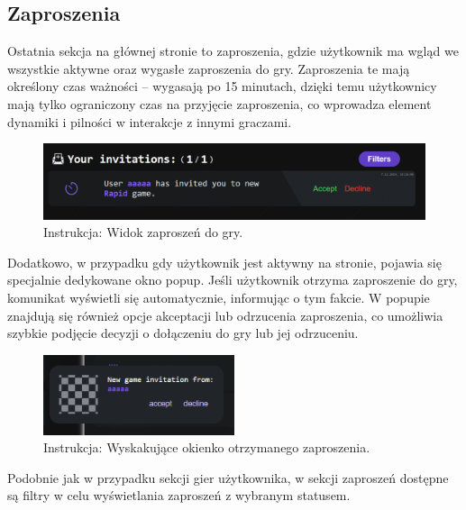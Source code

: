 \documentclass[12pt,a4paper]{article}
\begin{document}
\newpage

\subsection{Zaproszenia}

\noindent
Ostatnia sekcja na głównej stronie to zaproszenia, gdzie użytkownik ma wgląd we wszystkie aktywne oraz wygasłe zaproszenia do gry. Zaproszenia te mają określony czas ważności – wygasają po 15 minutach, dzięki temu użytkownicy mają tylko ograniczony czas na przyjęcie zaproszenia, co wprowadza element dynamiki i pilności w interakcje z innymi graczami.

\vspace{0.5cm}
\begin{figure}[h!]
    \centering
    \includegraphics[width=1\textwidth]{images/ins_min_inv_card.png}
    \caption{Instrukcja: Widok zaproszeń do gry.}
\end{figure}
\vspace{0.5cm}

\noindent
Dodatkowo, w przypadku gdy użytkownik jest aktywny na stronie, pojawia się specjalnie dedykowane okno popup. Jeśli użytkownik otrzyma zaproszenie do gry, komunikat wyświetli się automatycznie, informując o tym fakcie. W popupie znajdują się również opcje akceptacji lub odrzucenia zaproszenia, co umożliwia szybkie podjęcie decyzji o dołączeniu do gry lub jej odrzuceniu.

\vspace{0.5cm}
\begin{figure}[h!]
    \centering
    \includegraphics[width=0.5\textwidth]{images/ins_min_inv_popup.png}
    \caption{Instrukcja: Wyskakujące okienko otrzymanego zaproszenia.}
\end{figure}
\vspace{0.5cm}

\noindent
Podobnie jak w przypadku sekcji gier użytkownika, w sekcji zaproszeń dostępne są filtry w celu wyświetlania zaproszeń z wybranym statusem.
\end{document}
